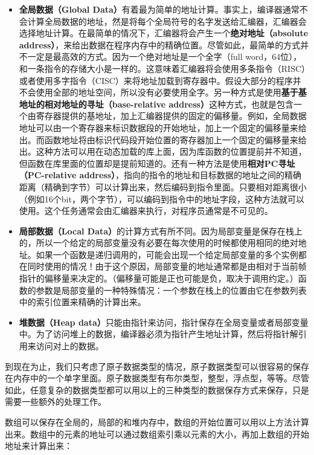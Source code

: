 \documentclass[cn,11pt,chinese]{elegantbook}
\begin{document}
\begin{itemize}
  \item \textbf{全局数据（Global Data）}有着最为简单的地址计算。事实上，编译器通常不会计算全局数据的地址，然是将每个全局符号的名字发送给汇编器，汇编器会选择地址计算。在最简单的情况下，汇编器将会产生一个\textbf{绝对地址（absolute address）}，来给出数据在程序内存中的精确位置。尽管如此，最简单的方式并不一定是最高效的方式。因为一个绝对地址是一个全字（full word，64位），和一条指令的存储大小是一样的。这意味着汇编器将会使用多条指令（RISC）或者使用多字指令（CISC）来将地址加载到寄存器中。假设大部分的程序并不会使用全部的地址空间，所以没有必要使用全字。另一种方式是使用\textbf{基于基地址的相对地址的寻址（base-relative address）}这种方式，也就是包含一个由寄存器提供的基地址，加上汇编器提供的固定的偏移量。例如，全局数据地址可以由一个寄存器来标识数据段的开始地址，加上一个固定的偏移量来给出。而函数地址将由标识代码段开始位置的寄存器加上一个固定的偏移量来给出。这种方法可以用在动态加载的库上面，因为库函数的位置提前并不知道，但函数在库里面的位置却是提前知道的。还有一种方法是使用\textbf{相对PC寻址（PC-relative address）}，指向的指令的地址和目标数据的地址之间的精确距离（精确到字节）可以计算出来，然后编码到指令里面。只要相对距离很小（例如16个bit，两个字节），可以编码到指令中的地址字段，这种方法就可以使用。这个任务通常会由汇编器来执行，对程序员通常是不可见的。
  \item \textbf{局部数据（Local Data）}的计算方式有所不同。因为局部变量是保存在栈上的，所以一个给定的局部变量没有必要在每次使用的时候都使用相同的绝对地址。如果一个函数是递归调用的，可能会出现一个给定局部变量的多个实例都在同时使用的情况！由于这个原因，局部变量的地址通常都是由相对于当前帧指针的偏移量来决定的。（偏移量可能是正也可能是负，取决于调用约定。）函数的参数是局部变量的一种特殊情况：一个参数在栈上的位置由它在参数列表中的索引位置来精确的计算出来。
  \item \textbf{堆数据（Heap data）}只能由指针来访问，指针保存在全局变量或者局部变量中。为了访问堆上的数据，编译器必须为指针产生地址计算，然后将指针解引用来访问对上的数据。
\end{itemize}

到现在为止，我们只考虑了原子数据类型的情况，原子数据类型可以很容易的保存在内存中的一个单字里面。原子数据类型有布尔类型，整型，浮点型，等等。尽管如此，任意复杂的数据类型都可以用以上的三种类型的数据保存方式来保存，只是需要一些额外的处理工作。

数组可以保存在全局的，局部的和堆内存中，数组的开始位置可以用以上方法计算出来。数组中的元素的地址可以通过数组索引乘以元素的大小，再加上数组的开始地址来计算出来：
\end{document}

